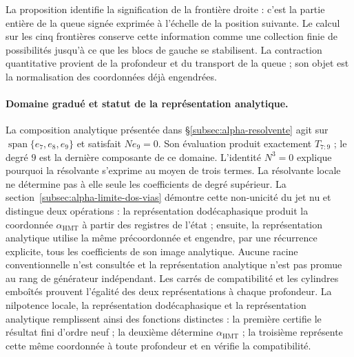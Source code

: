 La proposition identifie la signification de la frontière droite : c'est la
partie entière de la queue signée exprimée à l'échelle de la position
suivante. Le calcul sur les cinq frontières conserve cette information
comme une collection finie de possibilités jusqu'à ce que les blocs de
gauche se stabilisent. La contraction quantitative provient de la
profondeur et du transport de la queue ; son objet est la normalisation des
coordonnées déjà engendrées.

\paragraph{Domaine gradué et statut de la représentation analytique.}
\label{ampl-alfa-dominio-resolvente}
La composition analytique présentée dans \S\ref{subsec:alpha-resolvente} agit sur $\operatorname{span}\{e_7,e_8,e_9\}$ et satisfait $Ne_9=0$. Son évaluation produit exactement $T_{7:9}$ ; le degré $9$ est la dernière composante de ce domaine. L'identité $N^3=0$ explique pourquoi la résolvante s'exprime au moyen de trois termes. La résolvante locale ne détermine pas à elle seule les coefficients de degré supérieur. La section~\ref{subsec:alpha-limite-dos-vias} démontre cette non-unicité du jet nu et distingue deux opérations : la représentation dodécaphasique produit la coordonnée \(\alpha_{\mathrm{HMT}}\) à partir des registres de l'état ; ensuite, la représentation analytique utilise la même précoordonnée et engendre, par une récurrence explicite, tous les coefficients de son image analytique. Aucune racine conventionnelle n'est consultée et la représentation analytique n'est pas promue au rang de générateur indépendant. Les carrés de compatibilité et les cylindres emboîtés prouvent l'égalité des deux représentations à chaque profondeur. La nilpotence locale, la représentation dodécaphasique et la représentation analytique remplissent ainsi des fonctions distinctes : la première certifie le résultat fini d'ordre neuf ; la deuxième détermine \(\alpha_{\mathrm{HMT}}\) ; la troisième représente cette même coordonnée à toute profondeur et en vérifie la compatibilité.
